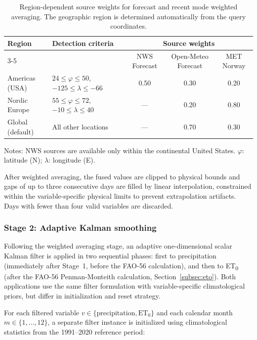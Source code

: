 \documentclass[preprint,review,12pt]{elsarticle}
\begin{document}
\begin{table}[htbp]
\centering
\caption{Region-dependent source weights for forecast and recent mode
weighted averaging. The geographic region is determined automatically from
the query coordinates.}
\label{tab:weights}
\begin{tabular}{@{}llccc@{}}
\toprule
Region & Detection criteria & \multicolumn{3}{c}{Source weights} \\
\cmidrule(l){3-5}
 & & NWS Forecast & Open-Meteo Forecast & MET Norway \\
\midrule
Americas (USA) & $24\leq\varphi\leq50$, $-125\leq\lambda\leq-66$ & 0.50 & 0.30 & 0.20 \\
Nordic Europe & $55\leq\varphi\leq72$, $-10\leq\lambda\leq40$ & --- & 0.20 & 0.80 \\
Global (default) & All other locations & --- & 0.70 & 0.30 \\
\bottomrule
\end{tabular}
\begin{flushleft}
\small Notes: NWS sources are available only within the continental United
States. $\varphi$: latitude (\textdegree{}N); $\lambda$: longitude
(\textdegree{}E).
\end{flushleft}
\end{table}

After weighted averaging, the fused values are clipped to physical bounds and
gaps of up to three consecutive days are filled by linear interpolation,
constrained within the variable-specific physical limits to prevent
extrapolation artifacts. Days with fewer than four valid variables are discarded.

\subsubsection*{Stage 2: Adaptive Kalman smoothing}

Following the weighted averaging stage, an adaptive one-dimensional scalar
Kalman filter \citep{Kalman1960} is applied in two sequential phases: first to
precipitation (immediately after Stage~1, before the FAO-56 calculation), and
then to ET\textsubscript{0} (after the FAO-56 Penman-Monteith calculation,
Section~\ref{subsec:eto}). Both applications use the same filter formulation
with variable-specific climatological priors, but differ in initialization and
reset strategy.

For each filtered variable $v \in \{\text{precipitation}, \text{ET}_0\}$ and
each calendar month $m \in \{1, \ldots, 12\}$, a separate filter instance is
initialized using climatological statistics from the 1991--2020 reference
period:
\end{document}
